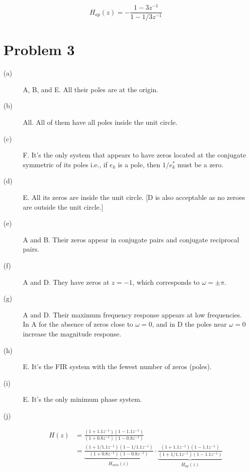 \documentclass{article}
\begin{document}
\begin{equation}
H_{ap}(z) = -\frac{1 - 3z^{-1}}{1 - 1/3z^{-1}}
\end{equation}

\FloatBarrier
\begin{figure}[h!]
	
\end{figure}
\FloatBarrier
\newpage

\section{Problem 3}
\begin{description}
	\item[(a)] A, B, and E. All their poles are at the origin.
	\item[(b)] All. All of them have all poles inside the unit circle.
	\item[(c)] F. It's the only system that appears to have zeros located at the conjugate symmetric of its poles i.e., if $e_k$ is a pole, then $1/e_k^*$ must be a zero.
	\item[(d)] E. All its zeros are inside the unit circle. [D is also acceptable as no zeroes are outside the unit circle.]
	\item[(e)] A and B. Their zeros appear in conjugate pairs and conjugate reciprocal pairs.
	\item[(f)] A and D. They have zeros at $z = -1$, which corresponds to $\omega = \pm\pi$.
	\item[(g)] A and D. Their maximum frequency response appears at low frequencies. In A for the absence of zeros close to $\omega =0$, and in D the poles near  $\omega =0$ increase the magnitude response.
	\item[(h)] E. It's the FIR system with the fewest number of zeros (poles).
	\item[(i)] E. It's the only minimum phase system.
	\item[(j)] 
	\begin{align}\nonumber
	H(z) &= \frac{(1 + 1.1z^{-1})(1 - 1.1z^{-1})}{(1 + 0.8z^{-1})(1 -0.8z^{-1})} \\
	&=\underbrace{\frac{(1 + 1/1.1z^{-1})(1 - 1/1.1z^{-1})}{(1 + 0.8z^{-1})(1 -0.8z^{-1})}}_{H_{min}(z)}\cdot\underbrace{\frac{(1 + 1.1z^{-1})(1 - 1.1z^{-1})}{(1 + 1/1.1z^{-1})(1 -1.1z^{-1})}}_{H_{ap}(z)}
	\end{align}
	
\end{description}	

\mbox{}\\ 
	
\end{document}
